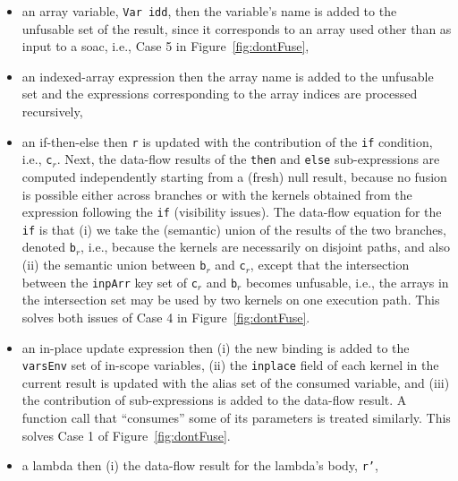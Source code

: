 \documentclass{sigplanconf}  %
\newcommand{\emp}[1]{\textcolor{DikuRed}{ #1}}
\begin{document}
\begin{itemize}
    \item an array variable, {\tt Var idd}, then the variable's 
            name is added to the unfusable set of the result,
            since it corresponds to an array used other than as 
            input to a {\sc soac}, i.e., \emp{Case 5} in Figure~\ref{fig:dontFuse},
    \item  an indexed-array expression then the array name is added to the 
            unfusable set and the expressions corresponding to the array indices
                are processed recursively,
    \item  an if-then-else then {\tt r} is updated with the contribution
            of the {\tt if} condition, i.e., {\tt c$_r$}. Next, the data-flow results of
            the {\tt then} and {\tt else} sub-expressions are computed independently 
            starting from a (fresh) null result, because no fusion is 
            possible either across branches or with the kernels obtained from the
            expression following the {\tt if} (visibility issues). 
            The data-flow equation for the {\tt if} is that (i) we take the (semantic) 
                union of the results of the two branches, denoted {\tt b$_r$}, i.e., because 
                the kernels are necessarily on disjoint paths, and also (ii)
                the semantic union between {\tt b$_r$} and {\tt c$_r$}, except that 
                the intersection between the {\tt inpArr} key set of {\tt c$_r$} and 
                {\tt b$_r$} becomes unfusable, i.e., the arrays in the intersection set
                may be used by two kernels on one execution path. 
            This solves both issues of \emp{Case 4} in Figure~\ref{fig:dontFuse}.
    \item an in-place update expression then (i) the new binding is added to the
            {\tt varsEnv} set of in-scope variables, (ii) the {\tt inplace}
            field of each kernel in the current result is updated with the
            alias set of the consumed variable, and (iii) the contribution of
            sub-expressions is added to the data-flow result. A function call
                that ``consumes'' some of its parameters is treated similarly.
                This solves \emp{Case 1} of Figure~\ref{fig:dontFuse}.
    \item a lambda then (i) the data-flow result for the lambda's body, {\tt r'},

\end{itemize}
\end{document}
